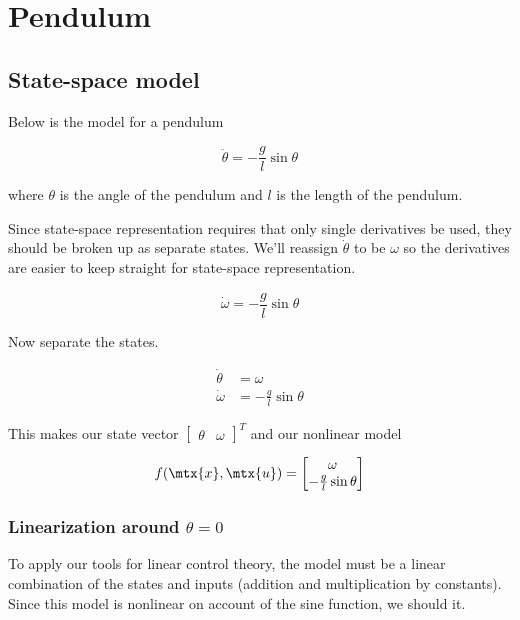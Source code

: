 \section{Pendulum}

\subsection{State-space model}

Below is the \gls{model} for a pendulum

\begin{equation*}
  \ddot{\theta} = -\frac{g}{l}\sin\theta
\end{equation*}

where $\theta$ is the angle of the pendulum and $l$ is the length of the
pendulum.

Since state-space representation requires that only single derivatives be used,
they should be broken up as separate \glspl{state}. We'll reassign
$\dot{\theta}$ to be $\omega$ so the derivatives are easier to keep straight for
state-space representation.

\begin{equation*}
  \dot{\omega} = -\frac{g}{l}\sin\theta
\end{equation*}

Now separate the \glspl{state}.

\begin{align*}
  \dot{\theta} &= \omega \\
  \dot{\omega} &= -\frac{g}{l} \sin\theta
\end{align*}

This makes our state vector $\begin{bmatrix}\theta & \omega\end{bmatrix}^T$ and
our nonlinear model

\begin{equation*}
  f(\mtx{x}, \mtx{u}) =
  \begin{bmatrix}
    \omega \\
    -\frac{g}{l}\sin\theta
  \end{bmatrix}
\end{equation*}

\subsubsection{Linearization around $\theta = 0$}

To apply our tools for linear control theory, the \gls{model} must be a linear
combination of the \glspl{state} and \glspl{input} (addition and multiplication
by constants). Since this \gls{model} is nonlinear on account of the sine
function, we should 
 it.

